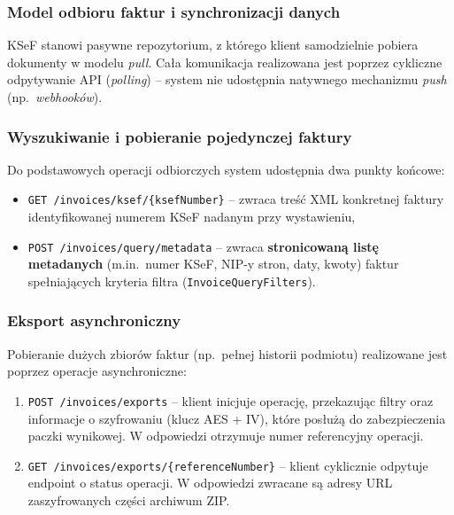 \subsubsection{Model odbioru faktur i synchronizacji danych}
\label{sec:ksef-odbieranie}

KSeF stanowi pasywne repozytorium, z którego klient samodzielnie pobiera dokumenty w modelu \textit{pull}. Cała komunikacja realizowana jest poprzez cykliczne odpytywanie API (\textit{polling}) -- system nie udostępnia natywnego mechanizmu \textit{push} (np.\ \textit{webhooków}). \cite{ksef-pobieranie-faktur}

\subsubsection*{Wyszukiwanie i pobieranie pojedynczej faktury} 

Do podstawowych operacji odbiorczych system udostępnia dwa punkty końcowe: \cite{ksef-pobieranie-faktur}

\begin{itemize}
    \item \texttt{GET /invoices/ksef/\{ksefNumber\}} -- zwraca treść XML konkretnej faktury identyfikowanej numerem KSeF nadanym przy wystawieniu,
    \item \texttt{POST /invoices/query/metadata} -- zwraca \textbf{stronicowaną listę metadanych} (m.in.\ numer KSeF, NIP-y stron, daty, kwoty) faktur spełniających kryteria filtra (\texttt{InvoiceQueryFilters}).
\end{itemize}

\subsubsection*{Eksport asynchroniczny} 

Pobieranie dużych zbiorów faktur (np.\ pełnej historii podmiotu) realizowane jest poprzez operacje asynchroniczne: \cite{ksef-pobieranie-faktur}

\begin{enumerate}
    \item \texttt{POST /invoices/exports} -- klient inicjuje operację, przekazując filtry oraz informacje o szyfrowaniu (klucz AES + IV), które posłużą do zabezpieczenia paczki wynikowej. W odpowiedzi otrzymuje numer referencyjny operacji.
    \item \texttt{GET /invoices/exports/\{referenceNumber\}} -- klient cyklicznie odpytuje endpoint o status operacji. W odpowiedzi zwracane są adresy URL zaszyfrowanych części archiwum ZIP.
\end{enumerate}

